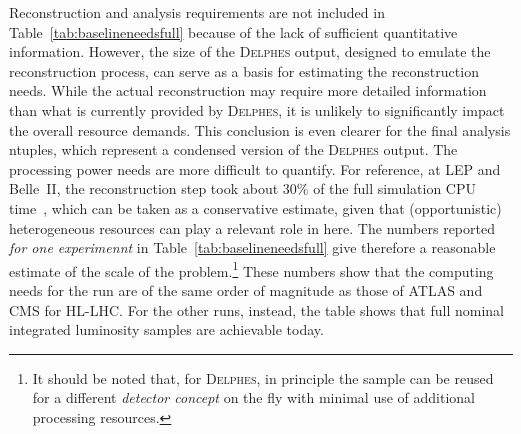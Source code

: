 Reconstruction and analysis requirements are not included in Table~\ref{tab:baselineneedsfull} 
because of the lack of sufficient quantitative information. 
However, the size of the \textsc{Delphes} output, designed to emulate the reconstruction process, 
can serve as a basis for estimating the reconstruction needs. 
While the actual reconstruction may require more detailed information than what is currently provided by \textsc{Delphes}, 
it is unlikely to significantly impact the overall resource demands. 
This conclusion is even clearer for the final analysis ntuples, which represent a condensed version of the \textsc{Delphes} output.
The processing power needs are more difficult to quantify. 
For reference, at LEP and Belle~II, the reconstruction step took about 30\% of the full simulation CPU time~\cite{ganhelfccres}, 
which can be taken as a conservative estimate, given that (opportunistic) heterogeneous resources can play a relevant role in here.
The numbers reported \emph{for one experimennt} in Table~\ref{tab:baselineneedsfull} 
give therefore a reasonable estimate of the scale of the 
problem.\footnote{It should be noted that, for \textsc{Delphes}, 
in principle the sample can be reused for a different \emph{detector concept} on the fly 
with minimal use of additional processing resources.}
These numbers show that the computing needs for the \PZ run are of the same order of magnitude as those 
of ATLAS and CMS  for HL-LHC. For the other runs, instead, the table shows that full nominal integrated luminosity samples are achievable today.

